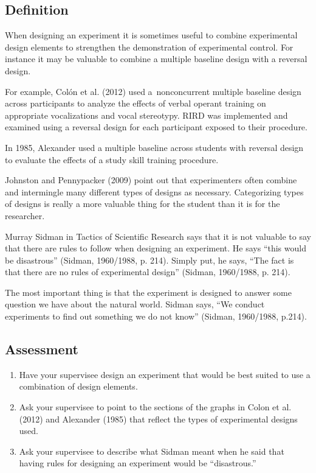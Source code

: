 \subsection{Definition}
When designing an experiment it is sometimes useful to combine experimental design elements to strengthen the demonstration of experimental control. For instance it may be valuable to combine a multiple baseline design with a reversal design. 

For example, Colón et al. (2012) used a nonconcurrent multiple baseline design across participants to analyze the effects of verbal operant training on appropriate vocalizations and vocal stereotypy. RIRD was implemented and examined using a reversal design for each participant exposed to their procedure.

In 1985, Alexander used a multiple baseline across students with reversal design to evaluate the effects of a study skill training procedure.

Johnston and Pennypacker (2009) point out that experimenters often combine and intermingle many different types of designs as necessary. Categorizing types of designs is really a more valuable thing for the student than it is for the researcher. 

Murray Sidman in Tactics of Scientific Research says that it is not valuable to say that there are rules to follow when designing an experiment. He says ``this would be disastrous'' (Sidman, 1960/1988, p. 214). Simply put, he says, ``The fact is that there are no rules of experimental design'' (Sidman, 1960/1988, p. 214).

The most important thing is that the experiment is designed to answer some question we have about the natural world. Sidman says, ``We conduct experiments to find out something we do not know'' (Sidman, 1960/1988, p.214).
%
\subsection{Assessment}
\begin{enumerate}
\item Have your supervisee design an experiment that would be best suited to use a combination of design elements.
\item Ask your supervisee to point to the sections of the graphs in Colon et al. (2012) and Alexander (1985) that reflect the types of experimental designs used. 
\item Ask your supervisee to describe what Sidman meant when he said that having rules for designing an experiment would be ``disastrous.''
\end{enumerate}
%
